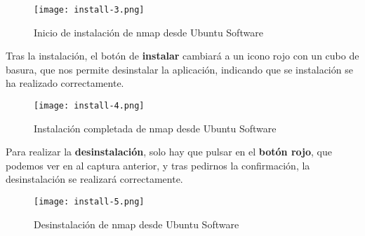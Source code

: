 \begin{itemize}
    \begin{figure}[H]
        \centering
        \texttt{[image: install-3.png]}
        \caption{Inicio de instalación de nmap desde Ubuntu Software}
    \end{figure}

    Tras la instalación, el botón de \textbf{instalar} cambiará a un icono rojo con un cubo de basura, que nos permite desinstalar la aplicación, indicando que se instalación se ha realizado correctamente.

   \begin{figure}[H]
        \centering
        \texttt{[image: install-4.png]}
        \caption{Instalación completada de nmap desde Ubuntu Software}
    \end{figure}

    Para realizar la \textbf{desinstalación}, solo hay que pulsar en el \textbf{botón rojo}, que podemos ver en al captura anterior, y tras pedirnos la confirmación, la desinstalación se realizará correctamente.

   \begin{figure}[H]
        \centering
        \texttt{[image: install-5.png]}
        \caption{Desinstalación de nmap desde Ubuntu Software}
    \end{figure}
\end{itemize}

%
%

